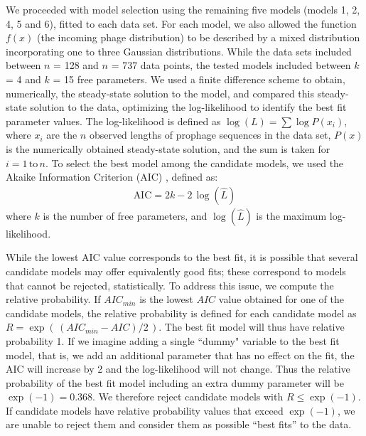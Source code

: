 We proceeded with model selection using the remaining five models (models 1, 2, 4, 5 and 6), fitted to each data set. For each model, we also allowed the function $f(x)$ (the incoming phage distribution) to be described by a mixed distribution incorporating one to three Gaussian distributions.  While the data sets included between $n$ = 128 and $n$ = 737 data points, the tested models included between $k$ = 4 and $k$ = 15 free parameters.  We used a finite difference scheme to obtain, numerically, the steady-state solution to the model, and compared this steady-state solution to the data, optimizing the log-likelihood to identify the best fit parameter values. The log-likelihood is defined as $\log(L) = \sum \log P(x_{i})$, 
where $x_{i}$ are the $n$ observed lengths of prophage sequences in the data set, $P(x)$ is the numerically obtained steady-state solution, and the sum is taken for $i = 1 \, \text{to} \, n$.
 To select the best model among the candidate models, we used the  Akaike Information Criterion (AIC) \citep{akaike_likelihood_1981}, defined as:
\begin{eqnarray}\label{aic}
\mbox{AIC} =2k -2\,\log\left(\hat{L}\right)
\end{eqnarray}
where $k$ is the number of free parameters, and $\log\left(\hat{L}\right)$ is the maximum log-likelihood. 

While the lowest AIC value corresponds to the best fit, it is possible that several candidate models may offer equivalently good fits; these correspond to models that cannot be rejected, statistically.  To address this issue, we compute the relative probability. If $AIC_{min}$ is the lowest $AIC$ value obtained for one of the candidate models, the relative probability \citep{burnham_model_2003} is defined for each candidate model as $R = \exp\left(\, ({AIC_{min}-AIC})/2\,\right)$.
The best fit model will thus have relative probability 1. If we imagine adding a single ``dummy" variable to the best fit model, that is, we add an additional parameter that has no effect on the fit, the AIC will increase by 2 and the log-likelihood will not change.  Thus the relative probability of the best fit model including an extra dummy parameter will be $\exp(-1) = 0.368$. We therefore reject candidate models with $R \leq \exp(-1)$.  If candidate models have relative probability values that exceed $\exp(-1)$, we are unable to reject them and consider them as possible ``best fits” to the data. 

